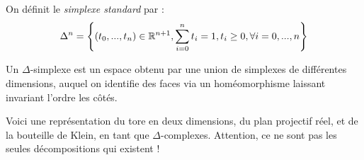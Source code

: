\begin{exemple}
On définit le \emph{simplexe standard} par : \[\Delta^n=\left\{(t_0,...,t_n)\in\mathbb{R}^{n+1},\sum_{i=0}^nt_i=1,t_i\geq0,\forall i=0,...,n\right\}\]
\end{exemple}

\begin{definition}
Un $\Delta$-simplexe est un espace obtenu par une union de simplexes de différentes dimensions, auquel on identifie des faces via un homéomorphisme laissant invariant l'ordre les côtés.
\end{definition}

\begin{exemple}
Voici une représentation du tore en deux dimensions, du plan projectif réel, et de la bouteille de Klein, en tant que $\Delta$-complexes. Attention, ce ne sont pas les seules décompositions qui existent !


\end{exemple}
